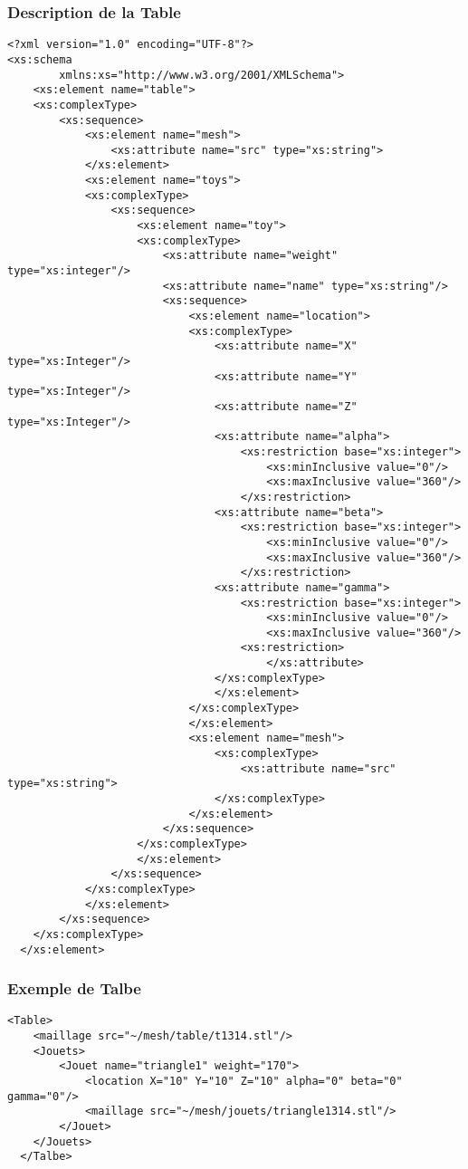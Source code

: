 \subsubsection{Description de la Table}
 \begin{lstlisting}[caption=Description de la Table, label=desctable]
<?xml version="1.0" encoding="UTF-8"?>
<xs:schema
        xmlns:xs="http://www.w3.org/2001/XMLSchema">
    <xs:element name="table">
    <xs:complexType>
        <xs:sequence>
            <xs:element name="mesh">
                <xs:attribute name="src" type="xs:string">
            </xs:element>
            <xs:element name="toys">
            <xs:complexType>
                <xs:sequence>
                    <xs:element name="toy">
                    <xs:complexType>
                        <xs:attribute name="weight" type="xs:integer"/>
                        <xs:attribute name="name" type="xs:string"/>
                        <xs:sequence>
                            <xs:element name="location">
                            <xs:complexType>
								<xs:attribute name="X" type="xs:Integer"/>
								<xs:attribute name="Y" type="xs:Integer"/>
								<xs:attribute name="Z" type="xs:Integer"/>
								<xs:attribute name="alpha">
									<xs:restriction base="xs:integer">
										<xs:minInclusive value="0"/>
										<xs:maxInclusive value="360"/>
									</xs:restriction> 
								<xs:attribute name="beta">
									<xs:restriction base="xs:integer">
										<xs:minInclusive value="0"/>
										<xs:maxInclusive value="360"/>
									</xs:restriction>
                                <xs:attribute name="gamma">
									<xs:restriction base="xs:integer">
										<xs:minInclusive value="0"/>
										<xs:maxInclusive value="360"/>
									<xs:restriction>
										</xs:attribute>
								</xs:complexType>
								</xs:element>
                            </xs:complexType>
                            </xs:element>
                            <xs:element name="mesh">
								<xs:complexType>
									<xs:attribute name="src" type="xs:string">
								</xs:complexType>
                            </xs:element>
                        </xs:sequence>
                    </xs:complexType>
                    </xs:element>
                </xs:sequence>
            </xs:complexType>
            </xs:element>
        </xs:sequence>
    </xs:complexType>
  </xs:element>
  \end{lstlisting}
  
\subsubsection{Exemple de Talbe}
  \begin{lstlisting}[caption=Description de la Table, label=desctable]
  <Table>
	<maillage src="~/mesh/table/t1314.stl"/>
	<Jouets>
		<Jouet name="triangle1" weight="170">
			<location X="10" Y="10" Z="10" alpha="0" beta="0" gamma="0"/>
			<maillage src="~/mesh/jouets/triangle1314.stl"/>
		</Jouet>
	</Jouets>
  </Talbe>
  \end{lstlisting}
